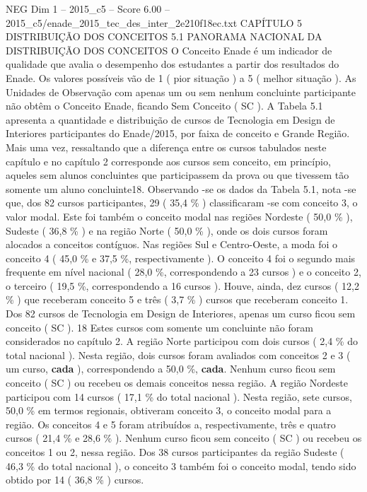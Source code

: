 \begin{textsample}{NEG Dim 1 – 2015\_c5 – Score 6.00 – 2015\_c5/enade\_2015\_tec\_des\_inter\_2e210f18ec.txt}  \label{ex:f1_neg_344}
CAPÍTULO 5 DISTRIBUIÇÃO DOS CONCEITOS 5.1 PANORAMA NACIONAL DA DISTRIBUIÇÃO DOS CONCEITOS O Conceito Enade é um indicador de qualidade que avalia o desempenho dos estudantes a partir dos resultados do Enade.
Os valores possíveis vão de 1 ( pior situação ) a 5 ( melhor situação ).
As Unidades de Observação com apenas um ou sem nenhum concluinte participante não obtêm o Conceito Enade, ficando Sem Conceito ( SC ).
A Tabela 5.1 apresenta a quantidade e distribuição de cursos de Tecnologia em Design de Interiores participantes do Enade/2015, por faixa de conceito e Grande Região.
Mais uma vez, ressaltando que a diferença entre os cursos tabulados neste capítulo e no capítulo 2 corresponde aos cursos sem conceito, em princípio, aqueles sem alunos concluintes que participassem da prova ou que tivessem tão somente um aluno concluinte18.
Observando -se os dados da Tabela 5.1, nota -se que, dos 82 cursos participantes, 29 ( 35,4 \% ) classificaram -se com conceito 3, o valor modal.
Este foi também o conceito modal nas regiões Nordeste ( 50,0 \% ), Sudeste ( 36,8 \% ) e na região Norte ( 50,0 \% ), onde os dois cursos foram alocados a conceitos contíguos.
Nas regiões Sul e Centro-Oeste, a moda foi o conceito 4 ( 45,0 \% e 37,5 \%, respectivamente ).
O conceito 4 foi o segundo mais frequente em nível nacional ( 28,0 \%, correspondendo a 23 cursos ) e o conceito 2, o terceiro ( 19,5 \%, correspondendo a 16 cursos ).
Houve, ainda, dez cursos ( 12,2 \% ) que receberam conceito 5 e três ( 3,7 \% ) cursos que receberam conceito 1.
Dos 82 cursos de Tecnologia em Design de Interiores, apenas um curso ficou sem conceito ( SC ). 18 Estes cursos com somente um concluinte não foram considerados no capítulo 2.
A região Norte participou com dois cursos ( 2,4 \% do total nacional ).
Nesta região, dois cursos foram avaliados com conceitos 2 e 3 ( um curso, \textbf{cada} ), correspondendo a 50,0 \%, \textbf{cada}.
Nenhum curso ficou sem conceito ( SC ) ou recebeu os demais conceitos nessa região.
A região Nordeste participou com 14 cursos ( 17,1 \% do total nacional ).
Nesta região, sete cursos, 50,0 \% em termos regionais, obtiveram conceito 3, o conceito modal para a região.
Os conceitos 4 e 5 foram atribuídos a, respectivamente, três e quatro cursos ( 21,4 \% e 28,6 \% ).
Nenhum curso ficou sem conceito ( SC ) ou recebeu os conceitos 1 ou 2, nessa região.
Dos 38 cursos participantes da região Sudeste ( 46,3 \% do total nacional ), o conceito 3 também foi o conceito modal, tendo sido obtido por 14 ( 36,8 \% ) cursos.

\end{textsample}

